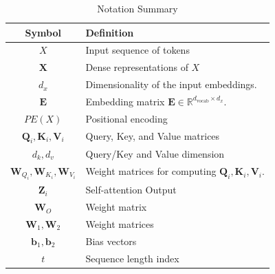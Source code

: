 \begin{table}[t]
    \centering
    \caption{Notation Summary}
    \label{tab:notation}
    \begin{tabular}{c|l}
        \toprule
        \textbf{Symbol} & \textbf{Definition} \\
        \midrule
        $X$ & Input sequence of tokens \\ \hline
        
        $\mathbf{X}$ & Dense representations of  $X$ \\ \hline

        $d_x$ & Dimensionality of the input embeddings. \\\hline

        
        $\mathbf{E}$ & Embedding matrix $\mathbf{E} \in \mathbb{R}^{d_{\text{vocab}} \times d_x}$. \\ \hline
        
        $PE(X)$ & Positional encoding \\ \hline
        
        $\mathbf{Q}_i, \mathbf{K}_i, \mathbf{V}_i$ & Query, Key, and Value matrices \\  \hline

         $d_k, d_v$ & Query/Key and Value dimension \\\hline

        $\mathbf{W}_{Q_i}, \mathbf{W}_{K_i}, \mathbf{W}_{V_i}$ & Weight matrices for computing $\mathbf{Q}_i, \mathbf{K}_i, \mathbf{V}_i$. \\\hline
        
        $\mathbf{Z}_i$ &  Self-attention Output  \\\hline
        
        $\mathbf{W}_O$ & Weight matrix \\\hline
        
        $\mathbf{W}_1, \mathbf{W}_2$ & Weight matrices \\ \hline
        
        $\mathbf{b}_1, \mathbf{b}_2$ & Bias vectors \\\hline
        
       
        $t$ &  Sequence length index \\\hline
        

\end{tabular}
\end{table}
